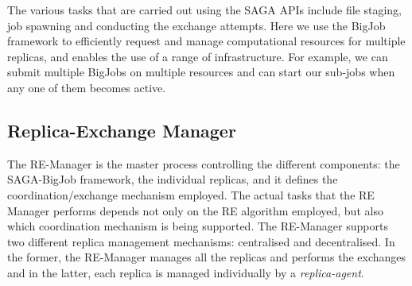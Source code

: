 \documentclass{rspublic}
\newcommand{\jhanote}[1]{ {\textcolor{red} { ***shantenu: #1 }}}
\newcommand{\alnote}[1]{ {\textcolor{blue} { ***andre: #1 }}}
\newcommand{\athotanote}[1]{ {\textcolor{green} { ***athota: #1 }}}
\newcommand{\alnote}[1]{}
\newcommand{\athotanote}[1]{}
\newcommand{\jhanote}[1]{}
\begin{document}
The various tasks that are carried out using the SAGA APIs include
file staging, job spawning and conducting the exchange attempts. Here
we use the BigJob framework to efficiently request and manage
computational resources for multiple replicas, and enables the use of
a range of infrastructure.  For example, we can submit multiple
BigJobs on multiple resources and can start our sub-jobs when any one
of them becomes active.






\subsection{Replica-Exchange Manager}\label{repexmanager} 

  
  
The RE-Manager is the master process controlling the different
components: the SAGA-BigJob framework, the individual replicas, and it
defines the coordination/exchange mechanism employed.  The actual
tasks that the RE Manager performs depends not only on the RE
algorithm employed, but also which coordination mechanism is being
supported.  The RE-Manager supports two different replica management
mechanisms: centralised and decentralised. In the former, the
RE-Manager manages all the replicas and performs the exchanges and in
the latter, each replica is managed individually by a {\it
  replica-agent}.
\end{document}
